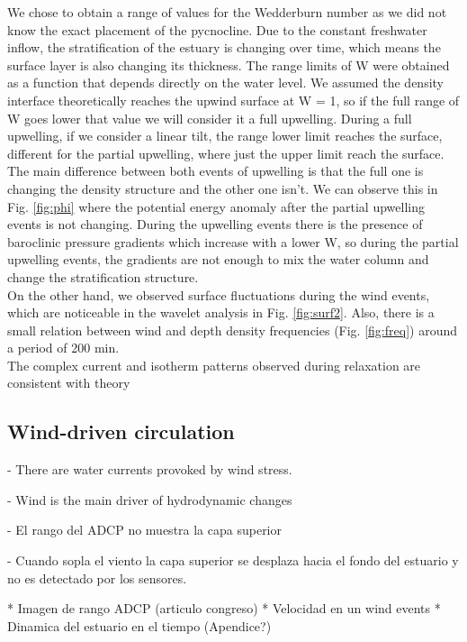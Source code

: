 \documentclass[tesis.tex]{subfiles}
\begin{document}
We chose to obtain a range of values for the Wedderburn number as we did not know the exact placement of the pycnocline. Due to the constant freshwater inflow, the stratification of the estuary is changing over time, which means the surface layer is also changing its thickness. The range limits of W were obtained as a function that depends directly on the water level. We assumed the density interface theoretically reaches the upwind surface at W = 1, so if the full range of W goes lower that value we will consider it a full upwelling. During a full upwelling, if we consider a linear tilt, the range lower limit reaches the surface, different for the partial upwelling, where just the upper limit reach the surface. The main difference between both events of upwelling is that the full one is changing the density structure and the other one isn't. We can observe this in Fig. \ref{fig:phi} where the potential energy anomaly after the partial upwelling events is not changing. During the upwelling events there is the presence of baroclinic pressure gradients which increase with a lower W, so during the partial upwelling events, the gradients are not enough to mix the water column and change the stratification structure.\\

On the other hand, we observed surface fluctuations during the wind events, which are noticeable in the wavelet analysis in Fig. \ref{fig:surf2}. Also, there is a small relation between wind and depth density frequencies (Fig. \ref{fig:freq}) around a period of 200 min.\\

The complex current and isotherm patterns observed during relaxation are consistent with theory

\subsection{Wind-driven circulation}

- There are water currents provoked by wind stress.

- Wind is the main driver of hydrodynamic changes

- El rango del ADCP no muestra la capa superior

- Cuando sopla el viento la capa superior se desplaza hacia el fondo del estuario y no es detectado por los sensores.

* Imagen de rango ADCP (articulo congreso)
* Velocidad en un wind events
* Dinamica del estuario en el tiempo (Apendice?)
\end{document}
